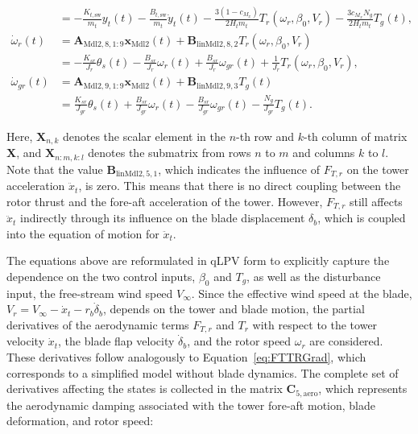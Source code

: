 {\begin{align*}
            &= -\frac{K_{t,\text{sw}}}{m_t} y_t(t) - \frac{B_{t,\text{sw}}}{m_t} \dot{y}_t(t)
            - \frac{3(1-c_{M_x})}{2 H_t m_t} T_r(\omega_r, \beta_0, V_r)
            - \frac{3 c_{M_x} N_g}{2 H_t m_t} T_g(t), \\[1ex]
            \dot{\omega}_r(t) &= \bm{A}_{\text{Mdl2}, 8, 1:9} \bm{x}_{\text{Mdl2}}(t) + \bm{B}_{\text{linMdl2}, 8, 2} T_r(\omega_r, \beta_0, V_r) \\
            &= -\frac{K_{sr}}{J_r} \theta_s(t) - \frac{B_{sr}}{J_r} \omega_r(t) + \frac{B_{sr}}{J_r} \omega_{gr}(t)
            + \frac{1}{J_r} T_r(\omega_r, \beta_0, V_r), \\[1ex]
            \dot{\omega}_{gr}(t) &= \bm{A}_{\text{Mdl2}, 9, 1:9} \bm{x}_{\text{Mdl2}}(t) + \bm{B}_{\text{linMdl2}, 9, 3} T_g(t) \\
            &= \frac{K_{sr}}{J_{gr}} \theta_s(t) + \frac{B_{sr}}{J_{gr}} \omega_r(t) - \frac{B_{sr}}{J_{gr}} \omega_{gr}(t)
            - \frac{N_g}{J_{gr}} T_g(t).
    \end{align*}}
    {
        Here, \(\bm{X}_{n,k}\) denotes the scalar element in the $n$-th row and $k$-th column of matrix \(\bm{X}\), and \(\bm{X}_{n:m, k:l}\) denotes the submatrix from rows \(n\) to \(m\) and columns \(k\) to \(l\). Note that the value $\bm{B}_{\text{linMdl2}, 5, 1}$, which indicates the influence of $F_{T,r}$ on the tower acceleration $\ddot{x}_t$, is zero. This means that there is no direct coupling between the rotor thrust and the fore-aft acceleration of the tower. However, $F_{T,r}$ still affects $\ddot{x}_t$ indirectly through its influence on the blade displacement $\delta_b$, which is coupled into the equation of motion for $\ddot{x}_t$.
        
        The equations above are reformulated in qLPV form to explicitly capture the dependence on the two control inputs, \(\beta_0\) and \(T_g\), as well as the disturbance input, the free-stream wind speed \(V_\infty\). Since the effective wind speed at the blade, \(V_r = V_\infty - \dot{x}_t - r_b\dot{\delta}_b\), depends on the tower and blade motion, the partial derivatives of the aerodynamic terms \(F_{T,r}\) and \(T_r\) with respect to the tower velocity \(\dot{x}_t\), the blade flap velocity \(\dot{\delta}_b\), and the rotor speed \(\omega_r\) are considered. These derivatives follow analogously to Equation~\eqref{eq:FTTRGrad}, which corresponds to a simplified model without blade dynamics. The complete set of derivatives affecting the states is collected in the matrix \(\mathbf{C}_{5,\text{aero}}\), which represents the aerodynamic damping associated with the tower fore-aft motion, blade deformation, and rotor speed:}
